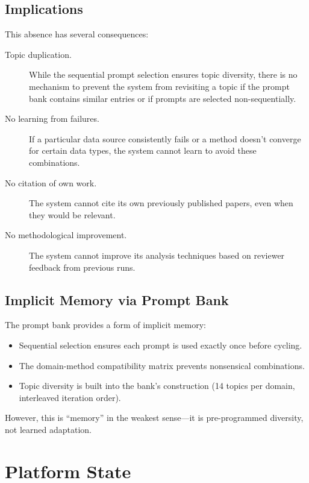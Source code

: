 \subsection{Implications}

This absence has several consequences:

\begin{description}
  \item[Topic duplication.] While the sequential prompt selection ensures topic diversity, there is no mechanism to prevent the system from revisiting a topic if the prompt bank contains similar entries or if prompts are selected non-sequentially.

  \item[No learning from failures.] If a particular data source consistently fails or a method doesn't converge for certain data types, the system cannot learn to avoid these combinations.

  \item[No citation of own work.] The system cannot cite its own previously published papers, even when they would be relevant.

  \item[No methodological improvement.] The system cannot improve its analysis techniques based on reviewer feedback from previous runs.
\end{description}

\subsection{Implicit Memory via Prompt Bank}

The prompt bank provides a form of implicit memory:
\begin{itemize}
  \item Sequential selection ensures each prompt is used exactly once before cycling.
  \item The domain-method compatibility matrix prevents nonsensical combinations.
  \item Topic diversity is built into the bank's construction (14 topics per domain, interleaved iteration order).
\end{itemize}

However, this is ``memory'' in the weakest sense---it is pre-programmed diversity, not learned adaptation.

\section{Platform State}
\label{sec:memory:platform}

